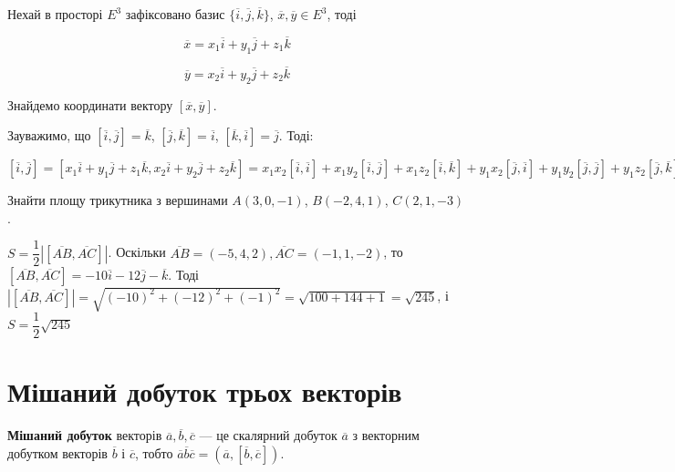 Нехай в просторі $E^3$ зафіксовано базис $\{\overline{i}, \overline{j}, \overline{k}\}$, $\overline{x}, \overline{y} \in E^3$, тоді 

$$\overline{x} = x_1\overline{i} + y_1\overline{j} + z_1\overline{k}$$

$$\overline{y} = x_2\overline{i} + y_2\overline{j} + z_2\overline{k}$$

Знайдемо координати вектору $[\overline{x}, \overline{y}]$.

Зауважимо, що $[\overline{i}, \overline{j}] = \overline{k}$, $[\overline{j}, \overline{k}] = \overline{i}$,
$[\overline{k}, \overline{i}] = \overline{j}$. Тоді:

\noindent$[\overline{i}, \overline{j}]
= [x_1\overline{i} + y_1\overline{j} + z_1\overline{k}
	, x_2\overline{i} + y_2\overline{j} + z_2\overline{k}]
= x_1 x_2[\overline{i},\overline{i}]
	+ x_1 y_2[\overline{i},\overline{j}]
	+ x_1 z_2[\overline{i},\overline{k}]
	+ y_1 x_2[\overline{j},\overline{i}]
	+ y_1 y_2[\overline{j},\overline{j}]
	+ y_1 z_2[\overline{j},\overline{k}]
	+ z_1 x_2[\overline{k},\overline{i}]
	+ z_1 y_2[\overline{k},\overline{j}]
	+ z_1 z_2[\overline{k},\overline{k}]
= (x_1 y_2 - x_2 y_1)[\overline{i},\overline{j}]
	+ (x_1 z_2 - x_2 z_1)[\overline{i},\overline{k}]
	+ (y_1 z_2 - y_2 z_1)[\overline{j},\overline{k}]
= (x_1 y_2 - x_2 y_1)\overline{k}
	+ (x_1 z_2 - x_2 z_1)\overline{j}
	+ (y_1 z_2 - y_2 z_1)\overline{i}
= (y_1 z_2 - y_2 z_1)\overline{i}
	+ (x_1 z_2 - x_2 z_1)\overline{j}
	+ (x_1 y_2 - x_2 y_1)\overline{k}.$

\begin{problem}
	Знайти площу трикутника з вершинами $A(3, 0, -1)$, $B(-2, 4, 1)$, $C(2, 1, -3)$. 
\end{problem}
\begin{solution}
	$S = \dfrac{1}{2}|[\overline{AB},\overline{AC}]|$. Оскільки
	$\overline{AB} = (-5, 4, 2), \overline{AC} = (-1, 1, -2)$,
	то $[\overline{AB},\overline{AC}] = -10\overline{i} - 12\overline{j} - \overline{k}$.
	Тоді $|[\overline{AB},\overline{AC}]| = \sqrt{(-10)^2 + (-12)^2 + (-1)^2}
	= \sqrt{100 + 144 + 1} = \sqrt{245}$, і $S = \dfrac{1}{2}\sqrt{245}$
\end{solution}

\section{Мішаний добуток трьох векторів}

\begin{definition}
	\textbf{Мішаний добуток} векторів $\overline{a}, \overline{b}, \overline{c}$ --- це скалярний добуток $\overline{a}$
	з векторним добутком векторів $\overline{b}$ і $\overline{c}$, тобто $\overline{a}\overline{b}\overline{c} = (\overline{a}, [\overline{b}, \overline{c}])$. 
\end{definition}

